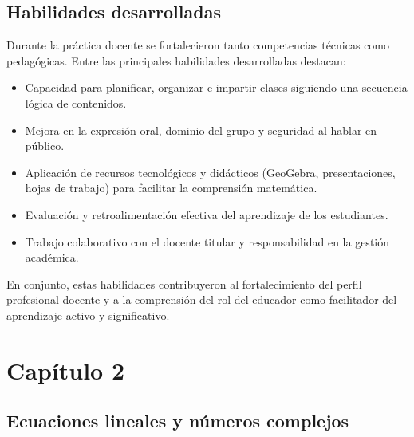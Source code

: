 \documentclass[12pt]{article}
\let\oldsection\section
\renewcommand{\section}{\clearpage\oldsection}
\begin{document}
	\subsection{Habilidades desarrolladas}
	Durante la práctica docente se fortalecieron tanto competencias técnicas como pedagógicas. Entre las principales habilidades desarrolladas destacan:
	\begin{itemize}
		\item Capacidad para planificar, organizar e impartir clases siguiendo una secuencia lógica de contenidos.
		\item Mejora en la expresión oral, dominio del grupo y seguridad al hablar en público.
		\item Aplicación de recursos tecnológicos y didácticos (GeoGebra, presentaciones, hojas de trabajo) para facilitar la comprensión matemática.
		\item Evaluación y retroalimentación efectiva del aprendizaje de los estudiantes.
		\item Trabajo colaborativo con el docente titular y responsabilidad en la gestión académica.
	
	\end{itemize}
	En conjunto, estas habilidades contribuyeron al fortalecimiento del perfil profesional docente y a la comprensión del rol del educador como facilitador del aprendizaje activo y significativo.
	
	
	
	
	
	
	
	
	
	
	
	
	
	
	
		
	\section{Capítulo 2}
	
	
	\subsection{Ecuaciones lineales y números complejos}
	
\end{document}
